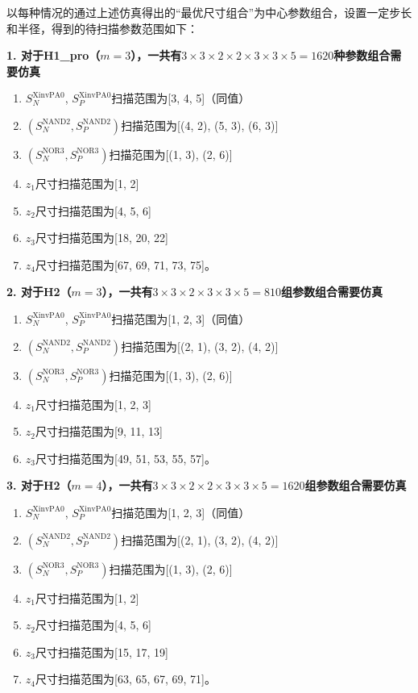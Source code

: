 \documentclass[UTF8,12pt,a4paper]{ctexart}
\begin{document}
以每种情况的通过上述仿真得出的“最优尺寸组合”为中心参数组合，设置一定步长和半径，得到的待扫描参数范围如下：

\textbf{1. 对于H1\_pro（$m = 3$），一共有$3\times3\times2\times2\times3\times3\times5=1620$种参数组合需要仿真}
\begin{enumerate}
    \item $S_N^{\text{XinvPA0}}$, $S_P^{\text{XinvPA0}}$扫描范围为[3, 4, 5]（同值）
    \item $(S_N^{\text{NAND2}}, S_P^{\text{NAND2}})$扫描范围为[(4, 2), (5, 3), (6, 3)]
    \item $(S_N^{\text{NOR3}}, S_P^{\text{NOR3}})$扫描范围为[(1, 3), (2, 6)]
    \item $z_1$尺寸扫描范围为[1, 2]
    \item $z_2$尺寸扫描范围为[4, 5, 6]
    \item $z_3$尺寸扫描范围为[18, 20, 22]
    \item $z_4$尺寸扫描范围为[67, 69, 71, 73, 75]。
\end{enumerate}

\textbf{2. 对于H2（$m = 3$），一共有$3\times3\times2\times3\times3\times5=810$组参数组合需要仿真}
\begin{enumerate}
    \item $S_N^{\text{XinvPA0}}$, $S_P^{\text{XinvPA0}}$扫描范围为[1, 2, 3]（同值）
    \item $(S_N^{\text{NAND2}}, S_P^{\text{NAND2}})$扫描范围为[(2, 1), (3, 2), (4, 2)]
    \item $(S_N^{\text{NOR3}}, S_P^{\text{NOR3}})$扫描范围为[(1, 3), (2, 6)]
    \item $z_1$尺寸扫描范围为[1, 2, 3]
    \item $z_2$尺寸扫描范围为[9, 11, 13]
    \item $z_3$尺寸扫描范围为[49, 51, 53, 55, 57]。
\end{enumerate}

\textbf{3. 对于H2（$m = 4$），一共有$3\times3\times2\times2\times3\times3\times5=1620$组参数组合需要仿真}
\begin{enumerate}
    \item $S_N^{\text{XinvPA0}}$, $S_P^{\text{XinvPA0}}$扫描范围为[1, 2, 3]（同值）
    \item $(S_N^{\text{NAND2}}, S_P^{\text{NAND2}})$扫描范围为[(2, 1), (3, 2), (4, 2)]
    \item $(S_N^{\text{NOR3}}, S_P^{\text{NOR3}})$扫描范围为[(1, 3), (2, 6)]
    \item $z_1$尺寸扫描范围为[1, 2]
    \item $z_2$尺寸扫描范围为[4, 5, 6]
    \item $z_3$尺寸扫描范围为[15, 17, 19]
    \item $z_4$尺寸扫描范围为[63, 65, 67, 69, 71]。
\end{enumerate}
\end{document}
